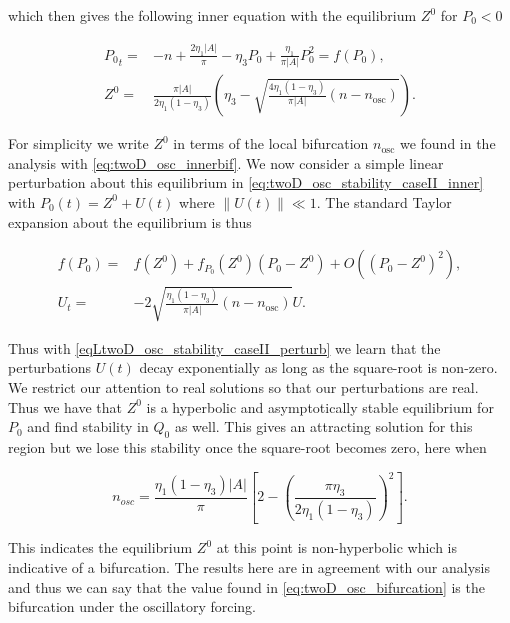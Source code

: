 which then gives the following inner equation with the equilibrium $Z^0$ for $P_0<0$

\begin{equation}\label{eq:twoD_osc_stability_caseII_inner}
\begin{aligned}
{P_0}_t=&-n+\frac{2\eta_1|A|}{\pi}-\eta_3 P_0+\frac{\eta_1}{\pi |A|}P_0^2=f(P_0),\\
Z^0=&\frac{\pi |A|}{2\eta_1(1-\eta_3)}\left(\eta_3-\sqrt{\frac{4\eta_1(1-\eta_3)}{\pi|A|}(n-n_{\text{osc}})}\right).
\end{aligned}
\end{equation}

For simplicity we write $Z^0$ in terms of the local bifurcation $n_{\text{osc}}$ we found in the analysis with \eqref{eq:twoD_osc_innerbif}. We now consider a simple linear perturbation about this equilibrium in \eqref{eq:twoD_osc_stability_caseII_inner} with $P_0(t)=Z^0+U(t)$ where $\lVert U(t)\rVert\ll 1$. The standard Taylor expansion about the equilibrium is thus

\begin{equation}\label{eqLtwoD_osc_stability_caseII_perturb}
\begin{aligned}
f(P_0)=&f(Z^0)+f_{P_0}(Z^0)(P_0-Z^0)+O((P_0-Z^0)^2),\\
U_t=&- 2\sqrt{\frac{\eta_1(1-\eta_3)}{\pi|A|}(n-n_{\text{osc}})}U.
\end{aligned}
\end{equation}

\indent Thus with \eqref{eqLtwoD_osc_stability_caseII_perturb} we learn that the perturbations $U(t)$ decay exponentially as long as the square-root is non-zero. We restrict our attention to real solutions so that our perturbations are real. Thus we have that $Z^0$ is a hyperbolic and asymptotically stable equilibrium for $P_0$ and find stability in $Q_0$ as well. This gives an attracting solution for this region but we lose this stability once the square-root becomes zero, here when

\begin{equation*}
n_{osc} = \frac{\eta_1(1-\eta_3)|A|}{\pi}\left[2-\left(\frac{\pi\eta_3}{2\eta_1(1-\eta_3)}\right)^2\right].
\end{equation*}

This indicates the equilibrium $Z^0$ at this point is non-hyperbolic which is indicative of a bifurcation. The results here are in agreement with our analysis and thus we can say that the value found in \eqref{eq:twoD_osc_bifurcation} is the bifurcation under the oscillatory forcing.


